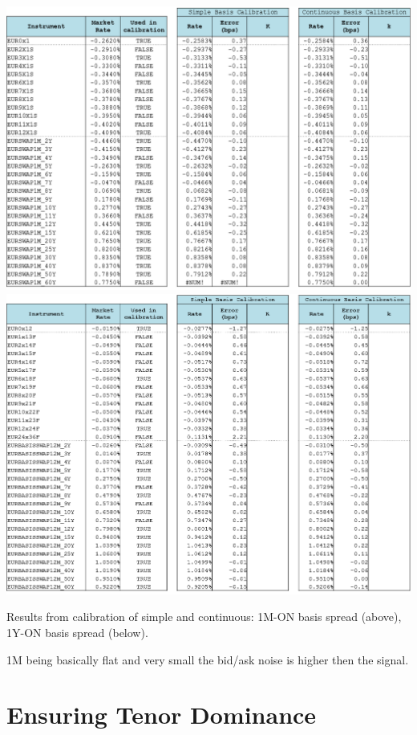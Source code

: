 \documentclass{article}
\begin{document}
\begin{table}[p]
\centering
\includegraphics[width=1\textwidth]{1mBasisFit.png}\vfill
\includegraphics[width=1\textwidth]{1yBasisFit.png}
\caption{Results from calibration of simple and continuous: 1M-ON basis spread (above), 1Y-ON basis spread (below).}
\label{1mBasisFit}
\end{table}

1M being basically flat and very small the bid/ask noise is higher then the signal.

\section{Ensuring Tenor Dominance}
\label{sec:ensuring-tenor-dominance}
\end{document}
